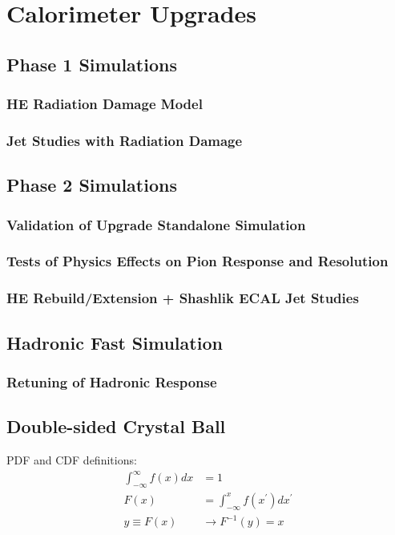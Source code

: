 \chapter{Calorimeter Upgrades
\label{ch:upgrades}}

\section{Phase 1 Simulations}

\subsection{HE Radiation Damage Model}

\subsection{Jet Studies with Radiation Damage}

\section{Phase 2 Simulations}

\subsection{Validation of Upgrade Standalone Simulation}

\subsection{Tests of Physics Effects on Pion Response and Resolution}

\subsection{HE Rebuild/Extension + Shashlik ECAL Jet Studies}

\section{Hadronic Fast Simulation}

\subsection{Retuning of Hadronic Response}

\section{Double-sided Crystal Ball}
PDF and CDF definitions:
\begin{align}
\int_{-\infty}^{\infty} f(x)dx &= 1 \\
F(x) &= \int_{-\infty}^{x} f(x^{\prime})dx^{\prime} \\
y \equiv F(x) &\rightarrow F^{-1}(y) = x
\end{align}

